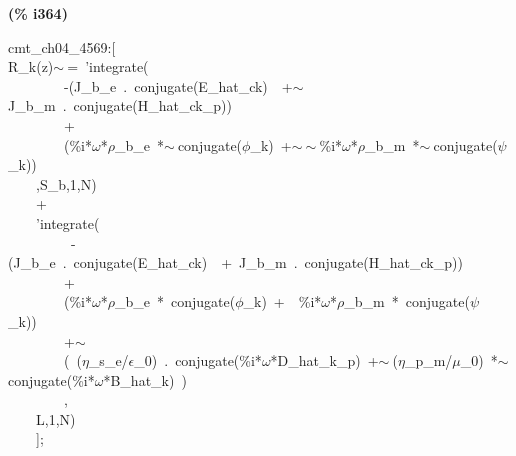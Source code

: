 \documentclass[fleqn]{article}
\begin{document}
\noindent
\begin{minipage}[t]{4.000000em}\color{red}\bfseries
(\% i364)	
\end{minipage}
\begin{minipage}[t]{\textwidth}\color{blue}
cmt\_ch04\_4569:[\\
R\_k(z)\ensuremath{\sim\ }=\ 'integrate(\ \ \\
\ \ \ \ \ \ \ \ -(J\_b\_e\ .\ conjugate(E\_hat\_ck)\ \ +\ensuremath{\sim\ }J\_b\_m\ .\ conjugate(H\_hat\_ck\_p))\ \\
\ \ \ \ \ \ \ \ +\\
\ \ \ \ \ \ \ \ (\%i*\ensuremath{\omega}*\ensuremath{\rho}\_b\_e\ *\ensuremath{\sim\ }conjugate(\ensuremath{\phi}\_k)\ +\ensuremath{\sim\ }\ensuremath{\sim\ }\%i*\ensuremath{\omega}*\ensuremath{\rho}\_b\_m\ *\ensuremath{\sim\ }conjugate(\ensuremath{\psi}\_k))\ \\
\ \ \ \ ,S\_b,1,N)\\
\ \ \ \ +\\
\ \ \ \ 'integrate(\\
\ \ \ \ \ \ \ \ \ -(J\_b\_e\ .\ conjugate(E\_hat\_ck)\ \ +\ J\_b\_m\ .\ conjugate(H\_hat\_ck\_p))\ \\
\ \ \ \ \ \ \ \ +\\
\ \ \ \ \ \ \ \ (\%i*\ensuremath{\omega}*\ensuremath{\rho}\_b\_e\ *\ conjugate(\ensuremath{\phi}\_k)\ +\ \ \%i*\ensuremath{\omega}*\ensuremath{\rho}\_b\_m\ *\ conjugate(\ensuremath{\psi}\_k))\ \\
\ \ \ \ \ \ \ \ +\ensuremath{\sim\ }\\
\ \ \ \ \ \ \ \ (\ (\ensuremath{\eta}\_s\_e/\ensuremath{\epsilon}\_0)\ .\ conjugate(\%i*\ensuremath{\omega}*D\_hat\_k\_p)\ +\ensuremath{\sim\ }(\ensuremath{\eta}\_p\_m/\ensuremath{\mu}\_0)\ *\ensuremath{\sim\ }conjugate(\%i*\ensuremath{\omega}*B\_hat\_k)\ )\\
\ \ \ \ \ \ \ \ ,\\
\ \ \ \ L,1,N)\\
\ \ \ \ ];
\end{minipage}
\end{document}
